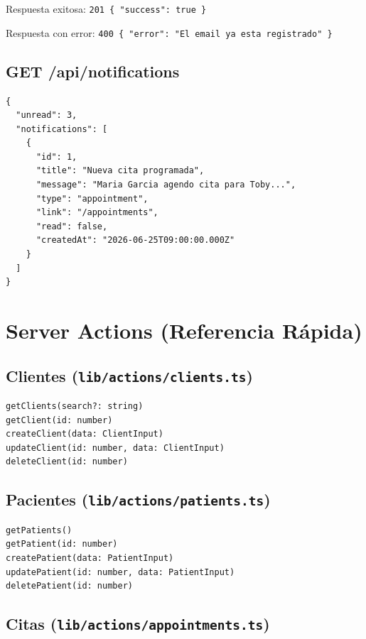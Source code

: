 Respuesta exitosa: \texttt{201 \{ "success": true \}}

Respuesta con error: \texttt{400 \{ "error": "El email ya esta registrado" \}}

\subsection{GET /api/notifications}

\begin{lstlisting}[style=json, caption=Respuesta de notificaciones]
{
  "unread": 3,
  "notifications": [
    {
      "id": 1,
      "title": "Nueva cita programada",
      "message": "Maria Garcia agendo cita para Toby...",
      "type": "appointment",
      "link": "/appointments",
      "read": false,
      "createdAt": "2026-06-25T09:00:00.000Z"
    }
  ]
}
\end{lstlisting}

\section{Server Actions (Referencia R\'apida)}

\subsection{Clientes (\texttt{lib/actions/clients.ts})}

\begin{lstlisting}[style=typescript]
getClients(search?: string)
getClient(id: number)
createClient(data: ClientInput)
updateClient(id: number, data: ClientInput)
deleteClient(id: number)
\end{lstlisting}

\subsection{Pacientes (\texttt{lib/actions/patients.ts})}

\begin{lstlisting}[style=typescript]
getPatients()
getPatient(id: number)
createPatient(data: PatientInput)
updatePatient(id: number, data: PatientInput)
deletePatient(id: number)
\end{lstlisting}

\subsection{Citas (\texttt{lib/actions/appointments.ts})}

